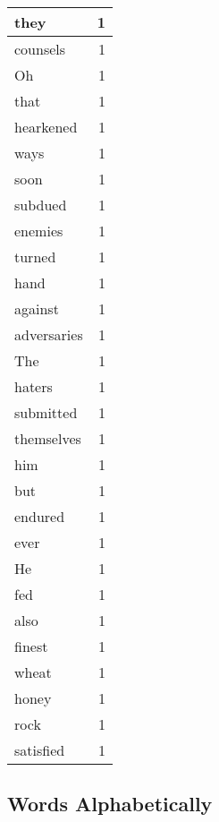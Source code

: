 \begin{center}
\begin{longtable}{l|r}
they & 1 \\ \hline
counsels & 1 \\ \hline
Oh & 1 \\ \hline
that & 1 \\ \hline
hearkened & 1 \\ \hline
ways & 1 \\ \hline
soon & 1 \\ \hline
subdued & 1 \\ \hline
enemies & 1 \\ \hline
turned & 1 \\ \hline
hand & 1 \\ \hline
against & 1 \\ \hline
adversaries & 1 \\ \hline
The & 1 \\ \hline
haters & 1 \\ \hline
submitted & 1 \\ \hline
themselves & 1 \\ \hline
him & 1 \\ \hline
but & 1 \\ \hline
endured & 1 \\ \hline
ever & 1 \\ \hline
He & 1 \\ \hline
fed & 1 \\ \hline
also & 1 \\ \hline
finest & 1 \\ \hline
wheat & 1 \\ \hline
honey & 1 \\ \hline
rock & 1 \\ \hline
satisfied & 1 \\ \hline
\end{longtable}
\end{center}



\normalsize



\subsection{Words Alphabetically}

